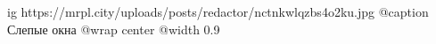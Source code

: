  
 
 
 
 

\ifcmt
  ig https://mrpl.city/uploads/posts/redactor/nctnkwlqzbs4o2ku.jpg
	@caption Слепые окна
  @wrap center
  @width 0.9
\fi

